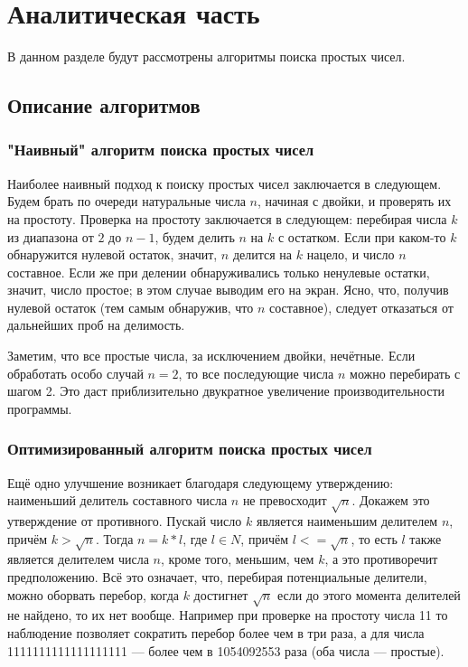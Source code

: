 \chapter{Аналитическая часть}
В данном разделе будут рассмотрены алгоритмы поиска простых чисел.

\section{Описание алгоритмов}

\subsection{"Наивный"  алгоритм поиска простых чисел}

Наиболее наивный подход к поиску простых чисел заключается в следующем. Будем брать по очереди натуральные числа $n$, начиная с двойки, и проверять их на простоту. Проверка на простоту заключается в следующем: перебирая числа $k$ из диапазона от $2$ до $n - 1$, будем делить $n$ на $k$ с остатком. Если при каком-то $k$ обнаружится нулевой остаток, значит, $n$ делится на $k$ нацело, и число $n$ составное. Если же при делении обнаруживались только ненулевые остатки, значит, число простое; в этом случае выводим его на экран. Ясно, что, получив нулевой остаток (тем самым обнаружив, что $n$ составное), следует отказаться от дальнейших проб на делимость.  

Заметим, что все простые числа, за исключением двойки, нечётные. Если обработать особо случай $n = 2$, то все последующие числа $n$ можно перебирать с шагом 2. Это даст приблизительно двукратное увеличение производительности программы.


\subsection{Оптимизированный алгоритм поиска простых чисел}

Ещё одно улучшение возникает благодаря следующему утверждению: наименьший делитель составного числа $n$ не превосходит $\sqrt{n}$. Докажем это утверждение от противного. Пускай число $k$ является наименьшим делителем $n$, причём $k > \sqrt{n}$. Тогда $n = k * l$, где $l \in N$, причём $l <= \sqrt{n}$, то есть $l$ также является делителем числа $n$, кроме того, меньшим, чем $k$, а это противоречит предположению. Всё это означает, что, перебирая потенциальные делители, можно оборвать перебор, когда $k$ достигнет $\sqrt{n}$  если до этого момента делителей не найдено, то их нет вообще. Например при проверке на простоту числа 11 то наблюдение позволяет сократить перебор более чем в три раза, а для числа 1111111111111111111 — более чем в 1054092553 раза (оба числа — простые).   

